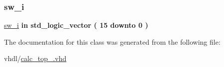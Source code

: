 \mbox{\label{classcalc__top_a91628ae1b8a6c62fdd738bc70aba3f1e}} 
\subsubsection{\texorpdfstring{sw\+\_\+i}{sw\_i}}
{\footnotesize\ttfamily \hyperlink{classcalc__top_a91628ae1b8a6c62fdd738bc70aba3f1e}{sw\+\_\+i} {\bfseries \textcolor{keywordflow}{in}\textcolor{vhdlchar}{ }} {\bfseries \textcolor{comment}{std\+\_\+logic\+\_\+vector}\textcolor{vhdlchar}{ }\textcolor{vhdlchar}{(}\textcolor{vhdlchar}{ }\textcolor{vhdlchar}{ } \textcolor{vhdldigit}{15} \textcolor{vhdlchar}{ }\textcolor{keywordflow}{downto}\textcolor{vhdlchar}{ }\textcolor{vhdlchar}{ } \textcolor{vhdldigit}{0} \textcolor{vhdlchar}{ }\textcolor{vhdlchar}{)}\textcolor{vhdlchar}{ }} \hspace{0.3cm}{\ttfamily [Port]}}



The documentation for this class was generated from the following file\+:\begin{DoxyCompactItemize}
\item 
vhdl/\hyperlink{calc__top___8vhd}{calc\+\_\+top\+\_\+.\+vhd}\end{DoxyCompactItemize}
